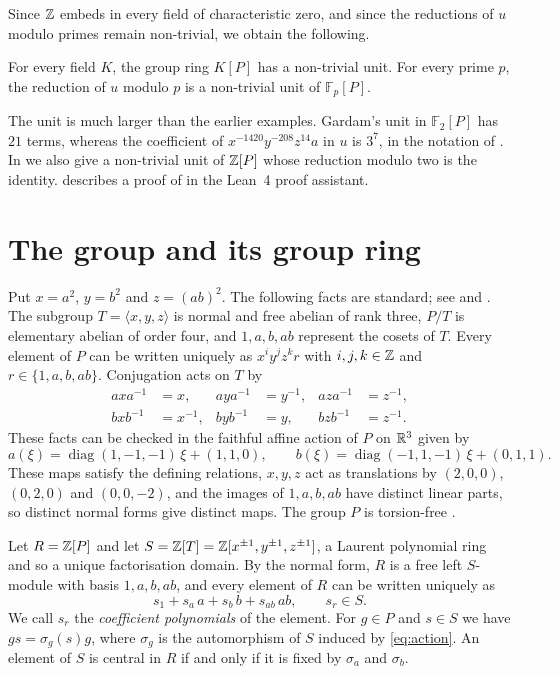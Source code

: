 \documentclass[11pt,colorlinks]{charlie}
\newcommand{\F}{\mathbb{F}}
\begin{document}
Since $\mathbb{Z}$ embeds in every field of characteristic zero, and since the reductions of $u$ modulo primes remain non-trivial, we obtain the following.

\begin{corollary}\label{cor:fields}
For every field $K$, the group ring $K[P]$ has a non-trivial unit. For every prime $p$, the reduction of $u$ modulo $p$ is a non-trivial unit of $\F_p[P]$.
\end{corollary}

The unit is much larger than the earlier examples. Gardam's unit in $\F_2[P]$ has $21$ terms, whereas the coefficient of $x^{-1420}y^{-208}z^{14}a$ in $u$ is $3^7$, in the notation of . In  we also give a non-trivial unit of $\mathbb{Z}[P]$ whose reduction modulo two is the identity.  describes a proof of  in the Lean~4 proof assistant.

\section{The group and its group ring}\label{sec:group}

Put $x=a^2$, $y=b^2$ and $z=(ab)^2$. The following facts are standard; see \cite[Section~3.1]{Gardam21} and \cite{Promislow}. The subgroup $T=\langle x,y,z\rangle$ is normal and free abelian of rank three, $P/T$ is elementary abelian of order four, and $1,a,b,ab$ represent the cosets of $T$. Every element of $P$ can be written uniquely as $x^iy^jz^kr$ with $i,j,k\in\mathbb{Z}$ and $r\in\{1,a,b,ab\}$. Conjugation acts on $T$ by
\begin{equation}\label{eq:action}
  \begin{aligned}
  axa^{-1}&=x, & aya^{-1}&=y^{-1}, & aza^{-1}&=z^{-1},\\
  bxb^{-1}&=x^{-1}, & byb^{-1}&=y, & bzb^{-1}&=z^{-1}.
  \end{aligned}
\end{equation}
These facts can be checked in the faithful affine action of $P$ on $\mathbb{R}^3$ given by
\[
  a(\xi)=\operatorname{diag}(1,-1,-1)\,\xi+(1,1,0),\qquad b(\xi)=\operatorname{diag}(-1,1,-1)\,\xi+(0,1,1).
\]
These maps satisfy the defining relations, $x,y,z$ act as translations by $(2,0,0)$, $(0,2,0)$ and $(0,0,-2)$, and the images of $1,a,b,ab$ have distinct linear parts, so distinct normal forms give distinct maps. The group $P$ is torsion-free \cite{Promislow}.

Let $R=\mathbb{Z}[P]$ and let $S=\mathbb{Z}[T]=\mathbb{Z}[x^{\pm1},y^{\pm1},z^{\pm1}]$, a Laurent polynomial ring and so a unique factorisation domain. By the normal form, $R$ is a free left $S$-module with basis $1,a,b,ab$, and every element of $R$ can be written uniquely as
\[
  s_1+s_a\,a+s_b\,b+s_{ab}\,ab,\qquad s_r\in S.
\]
We call $s_r$ the \emph{coefficient polynomials} of the element. For $g\in P$ and $s\in S$ we have $gs=\sigma_g(s)g$, where $\sigma_g$ is the automorphism of $S$ induced by \eqref{eq:action}. An element of $S$ is central in $R$ if and only if it is fixed by $\sigma_a$ and $\sigma_b$.
\end{document}
